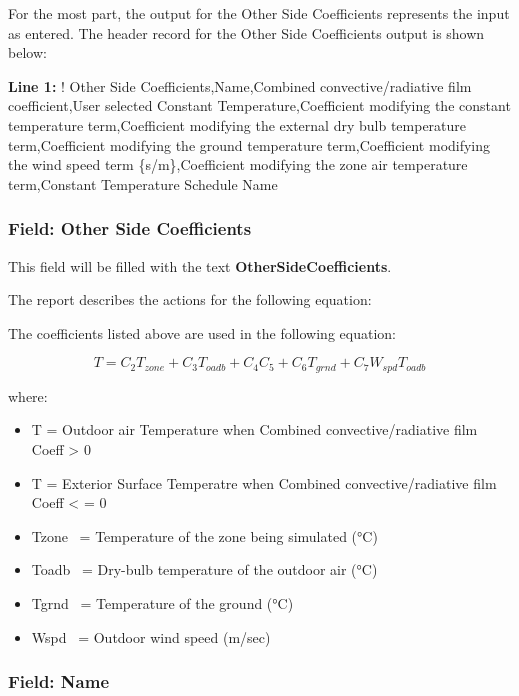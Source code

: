 For the most part, the output for the Other Side Coefficients represents the input as entered. The header record for the Other Side Coefficients output is shown below:

\textbf{Line 1:} ! Other Side Coefficients,Name,Combined convective/radiative film coefficient,User selected Constant Temperature,Coefficient modifying the constant temperature term,Coefficient modifying the external dry bulb temperature term,Coefficient modifying the ground temperature term,Coefficient modifying the wind speed term \{s/m\},Coefficient modifying the zone air temperature term,Constant Temperature Schedule Name

\subsubsection{Field: Other Side Coefficients}\label{field-other-side-coefficients}

This field will be filled with the text \textbf{OtherSideCoefficients}.

The report describes the actions for the following equation:

The coefficients listed above are used in the following equation:

\begin{equation}
T = C_2 T_{zone} + C_3 T_{oadb} + C_4 C_5 + C_6 T_{grnd} + C_7 W_{spd} T_{oadb}
\end{equation}

where:

\begin{itemize}
\tightlist
\item
  T = Outdoor air Temperature when Combined convective/radiative film Coeff \textgreater{} 0
\item
  T = Exterior Surface Temperatre when Combined convective/radiative film Coeff \textless{} = 0
\item
  Tzone~ = Temperature of the zone being simulated (°C)
\item
  Toadb~ = Dry-bulb temperature of the outdoor air (°C)
\item
  Tgrnd~ = Temperature of the ground (°C)
\item
  Wspd~ = Outdoor wind speed (m/sec)
\end{itemize}

\subsubsection{Field: Name}\label{field-name-11}

